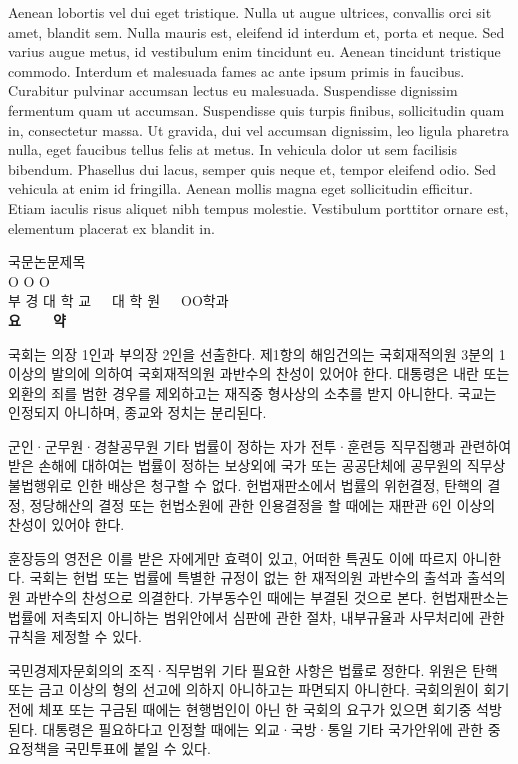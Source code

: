 {Aenean lobortis vel dui eget tristique. Nulla ut augue ultrices, convallis orci sit amet, blandit sem. 
Nulla mauris est, eleifend id interdum et, porta et neque. Sed varius augue metus, id vestibulum enim tincidunt eu. 
Aenean tincidunt tristique commodo. Interdum et malesuada fames ac ante ipsum primis in faucibus. 
Curabitur pulvinar accumsan lectus eu malesuada. Suspendisse dignissim fermentum quam ut accumsan. 
Suspendisse quis turpis finibus, sollicitudin quam in, consectetur massa. 
Ut gravida, dui vel accumsan dignissim, leo ligula pharetra nulla, eget faucibus tellus felis at metus. 
In vehicula dolor ut sem facilisis bibendum. Phasellus dui lacus, semper quis neque et, tempor eleifend odio. 
Sed vehicula at enim id fringilla. Aenean mollis magna eget sollicitudin efficitur. 
Etiam iaculis risus aliquet nibh tempus molestie. Vestibulum porttitor ornare est, elementum placerat ex blandit in. 
}

\newpage




\begin{center}
{\fontsize{10}{10}\selectfont
국문논문제목\\[1cm]
O O O\\[1cm]
부 경 대 학 교~~~대 학 원~~~OO학과\\[1cm]
\textbf{요~~~~약}\\[1cm]
}
\end{center}
\vspace{-0.5cm}
{\fontsize{8}{8}\selectfont
국회는 의장 1인과 부의장 2인을 선출한다. 제1항의 해임건의는 국회재적의원 3분의 1 이상의 발의에 의하여 국회재적의원 과반수의 찬성이 있어야 한다. 
대통령은 내란 또는 외환의 죄를 범한 경우를 제외하고는 재직중 형사상의 소추를 받지 아니한다. 국교는 인정되지 아니하며, 종교와 정치는 분리된다.

군인·군무원·경찰공무원 기타 법률이 정하는 자가 전투·훈련등 직무집행과 관련하여 받은 손해에 대하여는 법률이 정하는 보상외에 
국가 또는 공공단체에 공무원의 직무상 불법행위로 인한 배상은 청구할 수 없다. 
헌법재판소에서 법률의 위헌결정, 탄핵의 결정, 정당해산의 결정 또는 헌법소원에 관한 인용결정을 할 때에는 재판관 6인 이상의 찬성이 있어야 한다.

훈장등의 영전은 이를 받은 자에게만 효력이 있고, 어떠한 특권도 이에 따르지 아니한다. 
국회는 헌법 또는 법률에 특별한 규정이 없는 한 재적의원 과반수의 출석과 출석의원 과반수의 찬성으로 의결한다. 
가부동수인 때에는 부결된 것으로 본다. 헌법재판소는 법률에 저촉되지 아니하는 범위안에서 심판에 관한 절차, 
내부규율과 사무처리에 관한 규칙을 제정할 수 있다.

국민경제자문회의의 조직·직무범위 기타 필요한 사항은 법률로 정한다. 위원은 탄핵 또는 금고 이상의 형의 선고에 의하지 아니하고는 파면되지 아니한다. 
국회의원이 회기전에 체포 또는 구금된 때에는 현행범인이 아닌 한 국회의 요구가 있으면 회기중 석방된다. 
대통령은 필요하다고 인정할 때에는 외교·국방·통일 기타 국가안위에 관한 중요정책을 국민투표에 붙일 수 있다.
}

\newpage
